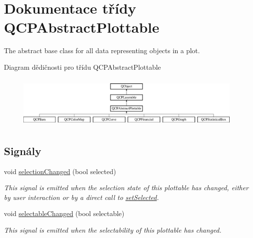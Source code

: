 \hypertarget{classQCPAbstractPlottable}{}\section{Dokumentace třídy Q\+C\+P\+Abstract\+Plottable}
\label{classQCPAbstractPlottable}


The abstract base class for all data representing objects in a plot.  


Diagram dědičnosti pro třídu Q\+C\+P\+Abstract\+Plottable\begin{figure}[H]
\begin{center}
\leavevmode
\includegraphics[height=2.629108cm]{classQCPAbstractPlottable}
\end{center}
\end{figure}
\subsection*{Signály}
\begin{DoxyCompactItemize}
\item 
\hypertarget{classQCPAbstractPlottable_a3af66432b1dca93b28e00e78a8c7c1d9}{}void \hyperlink{classQCPAbstractPlottable_a3af66432b1dca93b28e00e78a8c7c1d9}{selection\+Changed} (bool selected)\label{classQCPAbstractPlottable_a3af66432b1dca93b28e00e78a8c7c1d9}

\begin{DoxyCompactList}\small\item\em This signal is emitted when the selection state of this plottable has changed, either by user interaction or by a direct call to \hyperlink{classQCPAbstractPlottable_afbd5428c2952f59d952e11ab5cd79176}{set\+Selected}. \end{DoxyCompactList}\item 
void \hyperlink{classQCPAbstractPlottable_a0059caa3f3581f3959660fef8cbb71c4}{selectable\+Changed} (bool selectable)
\begin{DoxyCompactList}\small\item\em This signal is emitted when the selectability of this plottable has changed. \end{DoxyCompactList}\end{DoxyCompactItemize}
